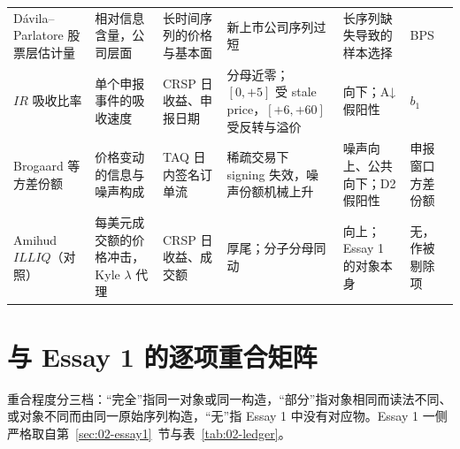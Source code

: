 \documentclass[a4paper,11pt]{ctexart}
\begin{document}
\begin{longtable}{@{}p{2.3cm}p{2.5cm}p{2.0cm}p{2.9cm}p{2.7cm}p{1.9cm}@{}}
\addlinespace
Dávila--Parlatore 股票层估计量 & 相对信息含量，公司层面 & 长时间序列的价格与基本面 & 新上市公司序列过短 & 长序列缺失导致的样本选择 & BPS \\
\addlinespace
$IR$ 吸收比率 & 单个申报事件的吸收速度 & CRSP 日收益、申报日期 & 分母近零；$[0,+5]$ 受 stale price，$[+6,+60]$ 受反转与溢价 & 向下；A↓假阳性 & $b_1$ \\
\addlinespace
Brogaard 等方差份额 & 价格变动的信息与噪声构成 & TAQ 日内签名订单流 & 稀疏交易下 signing 失效，噪声份额机械上升 & 噪声向上、公共向下；D2 假阳性 & 申报窗口方差份额 \\
\addlinespace
Amihud $ILLIQ$（对照） & 每美元成交额的价格冲击，Kyle $\lambda$ 代理 & CRSP 日收益、成交额 & 厚尾；分子分母同动 & 向上；Essay 1 的对象本身 & 无，作被剔除项 \\
\end{longtable}
\clearpage

\section{与 Essay 1 的逐项重合矩阵}\label{sec:10-overlap}

重合程度分三档：“完全”指同一对象或同一构造，“部分”指对象相同而读法不同、或对象不同而由同一原始序列构造，“无”指 Essay 1 中没有对应物。Essay 1 一侧严格取自第~\ref{sec:02-essay1}~节与表~\ref{tab:02-ledger}。
\end{document}
